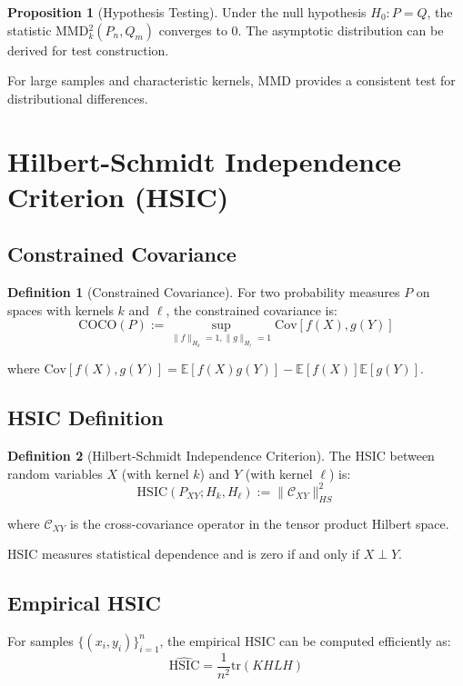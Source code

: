 \documentclass[12pt,a4paper]{article}
\theoremstyle{definition}
\newtheorem{definition}{Definition}[section]
\newtheorem{proposition}{Proposition}[section]
\begin{document}
\begin{proposition}[Hypothesis Testing]
Under the null hypothesis $H_0: P = Q$, the statistic MMD$_k^2(P_n, Q_m)$ converges to 0. The asymptotic distribution can be derived for test construction.

For large samples and characteristic kernels, MMD provides a consistent test for distributional differences.
\end{proposition}

\section{Hilbert-Schmidt Independence Criterion (HSIC)}

\subsection{Constrained Covariance}

\begin{definition}[Constrained Covariance]
For two probability measures $P$ on spaces with kernels $k$ and $\ell$, the constrained covariance is:
\[
\text{COCO}(P) := \sup_{\|f\|_{H_k}=1, \|g\|_{H_\ell}=1} \text{Cov}[f(X), g(Y)]
\]

where $\text{Cov}[f(X), g(Y)] = \mathbb{E}[f(X)g(Y)] - \mathbb{E}[f(X)]\mathbb{E}[g(Y)]$.
\end{definition}

\subsection{HSIC Definition}

\begin{definition}[Hilbert-Schmidt Independence Criterion]
The HSIC between random variables $X$ (with kernel $k$) and $Y$ (with kernel $\ell$) is:
\[
\text{HSIC}(P_{XY}; H_k, H_\ell) := \|\mathcal{C}_{XY}\|_{HS}^2
\]

where $\mathcal{C}_{XY}$ is the cross-covariance operator in the tensor product Hilbert space.
\end{definition}

HSIC measures statistical dependence and is zero if and only if $X \perp Y$.

\subsection{Empirical HSIC}

For samples $\{(x_i, y_i)\}_{i=1}^{n}$, the empirical HSIC can be computed efficiently as:
\[
\widehat{\text{HSIC}} = \frac{1}{n^2} \text{tr}(KHLH)
\]
\end{document}
